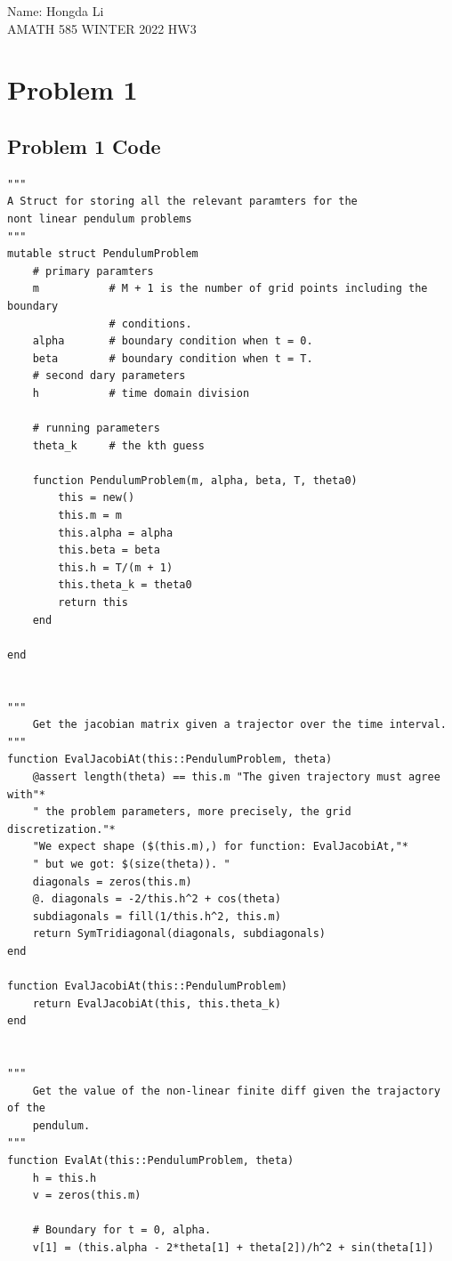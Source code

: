 \documentclass[]{article}
\begin{document}
\begin{center}
    Name: Hongda Li 
    \\
    AMATH 585 WINTER 2022 HW3
\end{center}
\section*{Problem 1}
    \subsection*{Problem 1 Code}
        \begin{lstlisting}
"""
A Struct for storing all the relevant paramters for the 
nont linear pendulum problems
"""
mutable struct PendulumProblem
    # primary paramters 
    m           # M + 1 is the number of grid points including the boundary 
                # conditions. 
    alpha       # boundary condition when t = 0. 
    beta        # boundary condition when t = T. 
    # second dary parameters
    h           # time domain division 

    # running parameters
    theta_k     # the kth guess 

    function PendulumProblem(m, alpha, beta, T, theta0)
        this = new()
        this.m = m
        this.alpha = alpha
        this.beta = beta
        this.h = T/(m + 1)
        this.theta_k = theta0
        return this 
    end

end


"""
    Get the jacobian matrix given a trajector over the time interval. 
"""
function EvalJacobiAt(this::PendulumProblem, theta) 
    @assert length(theta) == this.m "The given trajectory must agree with"*
    " the problem parameters, more precisely, the grid discretization."*
    "We expect shape ($(this.m),) for function: EvalJacobiAt,"*
    " but we got: $(size(theta)). "
    diagonals = zeros(this.m)
    @. diagonals = -2/this.h^2 + cos(theta)
    subdiagonals = fill(1/this.h^2, this.m)
    return SymTridiagonal(diagonals, subdiagonals)
end

function EvalJacobiAt(this::PendulumProblem)
    return EvalJacobiAt(this, this.theta_k)
end


"""
    Get the value of the non-linear finite diff given the trajactory of the 
    pendulum. 
"""
function EvalAt(this::PendulumProblem, theta)
    h = this.h
    v = zeros(this.m)
    
    # Boundary for t = 0, alpha. 
    v[1] = (this.alpha - 2*theta[1] + theta[2])/h^2 + sin(theta[1])
    

\end{lstlisting}
\end{document}
